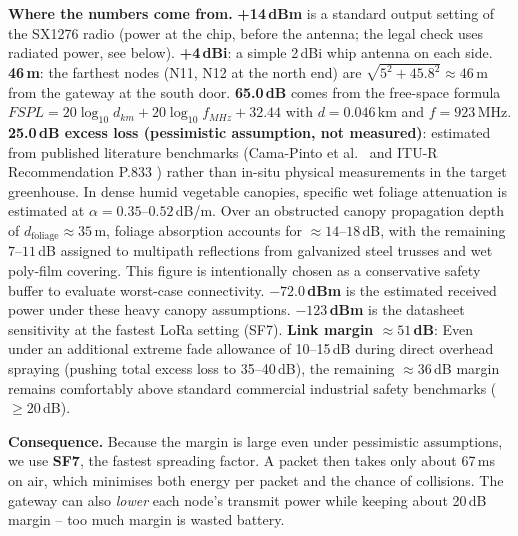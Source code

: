 \documentclass[11pt,a4paper]{report}
\newcommand{\why}[1]{\par\noindent\colorbox{gray!10}{\parbox{\dimexpr\linewidth-2\fboxsep}{\small\textbf{Where the numbers come from.} #1}}\par}
\begin{document}
\why{
\textbf{+14\,dBm} is a standard output setting of the SX1276 radio (power at the chip, before the antenna; the legal check uses radiated power, see below).
\textbf{+4\,dBi}: a simple 2\,dBi whip antenna on each side.
\textbf{46\,m}: the farthest nodes (N11, N12 at the north end) are $\sqrt{5^2 + 45.8^2} \approx 46$\,m from the gateway at the south door.
\textbf{65.0\,dB} comes from the free-space formula $FSPL = 20\log_{10} d_{km} + 20\log_{10} f_{MHz} + 32.44$ with $d = 0.046$\,km and $f = 923$\,MHz.
\textbf{25.0\,dB excess loss (pessimistic assumption, not measured)}: estimated from published literature benchmarks (Cama-Pinto et al.\ \cite{camapinto} and ITU-R Recommendation P.833 \cite{itur}) rather than in-situ physical measurements in the target greenhouse. In dense humid vegetable canopies, specific wet foliage attenuation is estimated at $\alpha = 0.35$--$0.52$\,dB/m. Over an obstructed canopy propagation depth of $d_{\text{foliage}} \approx 35$\,m, foliage absorption accounts for $\approx 14$--$18$\,dB, with the remaining $7$--$11$\,dB assigned to multipath reflections from galvanized steel trusses and wet poly-film covering. This figure is intentionally chosen as a conservative safety buffer to evaluate worst-case connectivity.
\textbf{$-72.0$\,dBm} is the estimated received power under these heavy canopy assumptions.
\textbf{$-123$\,dBm} is the datasheet sensitivity at the fastest LoRa setting (SF7).
\textbf{Link margin $\approx 51$\,dB}: Even under an additional extreme fade allowance of 10--15\,dB during direct overhead spraying (pushing total excess loss to 35--40\,dB), the remaining $\approx 36$\,dB margin remains comfortably above standard commercial industrial safety benchmarks ($\ge 20$\,dB).
}

\textbf{Consequence.} Because the margin is large even under pessimistic assumptions, we use \textbf{SF7}, the fastest spreading factor. A packet then takes only about 67\,ms on air, which minimises both energy per packet and the chance of collisions. The gateway can also \emph{lower} each node's transmit power while keeping about 20\,dB margin -- too much margin is wasted battery.
\end{document}

